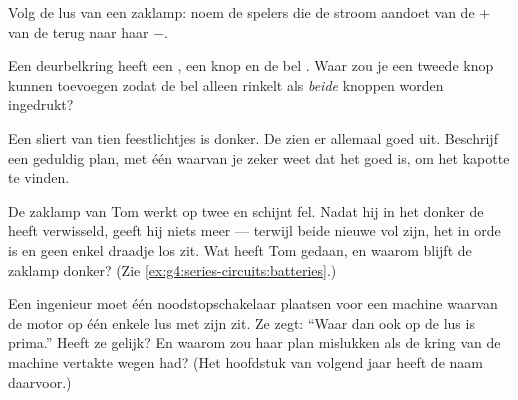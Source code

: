 \begin{exercise}[$\star$]\label{exo:g4:series-circuits:7}
Volg de lus van een zaklamp: noem de spelers die de stroom aandoet van
de $+$ van de  terug naar haar $-$.
\end{exercise}

\begin{exercise}[$\star$]\label{exo:g4:series-circuits:8}
Een deurbelkring heeft een , een knop en de bel
. Waar zou je een tweede knop kunnen toevoegen zodat de bel
alleen rinkelt als \emph{beide} knoppen worden ingedrukt?
\end{exercise}

\begin{exercise}[$\star$]\label{exo:g4:series-circuits:9}
Een sliert van tien feestlichtjes  is donker. De
 zien er allemaal goed uit. Beschrijf een geduldig plan, met
één  waarvan je zeker weet dat het goed is, om het kapotte te
vinden.
\end{exercise}

\begin{exercise}[$\star\star$]\label{exo:g4:series-circuits:10}
De zaklamp van Tom werkt op twee  en schijnt fel. Nadat hij
in het donker de  heeft verwisseld, geeft hij niets meer ---
terwijl beide nieuwe  vol zijn, het  in orde is en
geen enkel draadje los zit. Wat heeft Tom gedaan, en waarom blijft de
zaklamp donker? (Zie \cref{ex:g4:series-circuits:batteries}.)
\end{exercise}

\begin{exercise}[$\star\star$]\label{exo:g4:series-circuits:11}
Een ingenieur moet één noodstopschakelaar plaatsen voor een machine
waarvan de motor op één enkele lus met zijn  zit. Ze zegt:
``Waar dan ook op de lus is prima.'' Heeft ze gelijk? En waarom zou
haar plan mislukken als de kring van de machine vertakte wegen had?
(Het hoofdstuk van volgend jaar heeft de naam daarvoor.)
\end{exercise}

